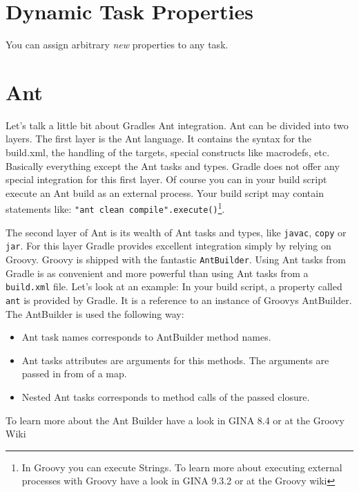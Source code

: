 \section{Dynamic Task Properties} %
\label{sec:dynamic_properties}
You can assign arbitrary \emph{new} properties to any task.

\section{Ant}
Let's talk a little bit about Gradles Ant integration. Ant can be divided into two layers. The first layer is the Ant language. It contains the syntax for the build.xml, the handling of the targets, special constructs like macrodefs, etc. Basically everything except the Ant tasks and types. Gradle does not offer any special integration for this first layer. Of course you can in your build script execute an Ant build as an external process. Your build script may contain statements like: \texttt{"ant clean compile".execute()}\footnote{In Groovy you can execute Strings. To learn more about executing external processes with Groovy have a look in GINA 9.3.2 or at the Groovy wiki}.

The second layer of Ant is its wealth of Ant tasks and types, like \texttt{javac}, \texttt{copy} or \texttt{jar}. For this layer Gradle provides excellent integration simply by relying on Groovy. Groovy is shipped with the fantastic \texttt{AntBuilder}. Using Ant tasks from Gradle is as convenient and more powerful than using Ant tasks from a \texttt{build.xml} file. Let's look at an example:
In your build script, a property called \texttt{ant} is provided by Gradle. It is a reference to an instance of Groovys AntBuilder. The AntBuilder is used the following way:
\begin{itemize}
\item Ant task names corresponds to AntBuilder method names.
\item Ant tasks attributes are arguments for this methods. The arguments are passed in from of a map.
\item Nested Ant tasks corresponds to method calls of the passed closure.
\end{itemize}
To learn more about the Ant Builder have a look in GINA 8.4 or at the Groovy Wiki

